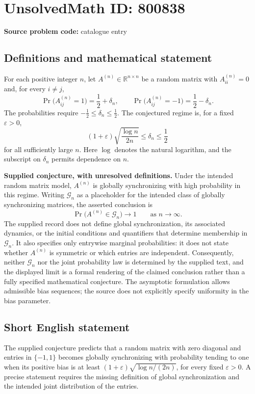 \documentclass[11pt]{article}
\newcommand{\R}{\mathbb{R}}
\begin{document}
\section*{UnsolvedMath ID: 800838}
\textbf{Source problem code:} catalogue entry
\subsection{Definitions and mathematical statement}
For each positive integer \(n\), let \(A^{(n)}\in\R^{n\times n}\) be a random matrix with \(A^{(n)}_{ii}=0\) and, for every \(i\ne j\),
\[
\Pr\bigl(A^{(n)}_{ij}=1\bigr)=\frac12+\delta_n,
\qquad
\Pr\bigl(A^{(n)}_{ij}=-1\bigr)=\frac12-\delta_n.
\]
The probabilities require \(-\tfrac12\leq\delta_n\leq\tfrac12\). The conjectured regime is, for a fixed \(\varepsilon>0\),
\[
(1+\varepsilon)\sqrt{\frac{\log n}{2n}}
\leq\delta_n\leq\frac12
\]
for all sufficiently large \(n\). Here \(\log\) denotes the natural logarithm, and the subscript on \(\delta_n\) permits dependence on \(n\).

\textbf{Supplied conjecture, with unresolved definitions.} Under the intended random matrix model, \(A^{(n)}\) is globally synchronizing with high probability in this regime. Writing \(\mathcal G_n\) as a placeholder for the intended class of globally synchronizing matrices, the asserted conclusion is
\[
\Pr\bigl(A^{(n)}\in\mathcal G_n\bigr)\longrightarrow 1
\qquad\text{as }n\longrightarrow\infty.
\]
The supplied record does not define global synchronization, its associated dynamics, or the initial conditions and quantifiers that determine membership in \(\mathcal G_n\). It also specifies only entrywise marginal probabilities: it does not state whether \(A^{(n)}\) is symmetric or which entries are independent. Consequently, neither \(\mathcal G_n\) nor the joint probability law is determined by the supplied text, and the displayed limit is a formal rendering of the claimed conclusion rather than a fully specified mathematical conjecture. The asymptotic formulation allows admissible bias sequences; the source does not explicitly specify uniformity in the bias parameter.
\subsection{Short English statement}
The supplied conjecture predicts that a random matrix with zero diagonal and entries in \(\{-1,1\}\) becomes globally synchronizing with probability tending to one when its positive bias is at least \((1+\varepsilon)\sqrt{\log n/(2n)}\), for every fixed \(\varepsilon>0\). A precise statement requires the missing definition of global synchronization and the intended joint distribution of the entries.
\end{document}
